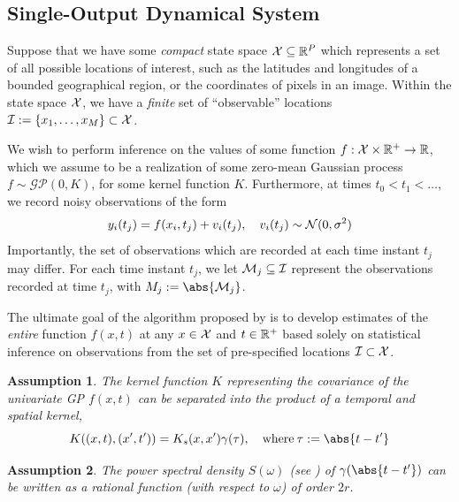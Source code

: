 \documentclass[10pt]{article}
\newtheorem{assumption}{Assumption}[section]
\numberwithin{equation}{section}
\newcommand{\calGP}{\mathcal{GP}}
\begin{document}
\subsection{Single-Output Dynamical System}
Suppose that we have some \emph{compact} state space $\mathcal{X} \subseteq \mathbb{R}^{P}$ which represents a set of all possible locations of interest, such as the latitudes and longitudes of a bounded geographical region, or the coordinates of pixels in an image. Within the state space $\mathcal{X}$, we have a \emph{finite} set of ``observable'' locations $\mathcal{I} := \{x_{1}, \dots, x_{M}\} \subset \mathcal{X}$.

We wish to perform inference on the values of some function $f: \mathcal{X} \times \mathbb{R}^{+} \to \mathbb{R}$, which we assume to be a realization of some zero-mean Gaussian process $f \sim \calGP(0, K)$, for some kernel function $K$. Furthermore, at times $t_{0} < t_{1} < \dots$, we record noisy observations of the form 
\begin{equation}
\label{eq:todescato-obs-model}
    y_{i}(t_{j}) = f(x_{i}, t_{j}) + v_{i}(t_{j}), \quad v_{i}(t_{j}) \sim \mathcal{N}(0, \sigma^{2}) 
\end{equation}
Importantly, the set of observations which are recorded at each time instant $t_{j}$ may differ. For each time instant $t_{j}$, we let $\mathcal{M}_{j} \subseteq \mathcal{I}$ represent the observations recorded at time $t_{j}$, with $M_{j} := \abs{\calM_{j}}$. 

The ultimate goal of the algorithm proposed by \citeauthor{Todescato-Efficient-2020} is to develop estimates of the \emph{entire} function $f(x, t)$ at any $x \in \mathcal{X}$ and $t \in \mathbb{R}^{+}$ based solely on statistical inference on observations from the set of pre-specified locations $\mathcal{I} \subset \mathcal{X}$.

\begin{assumption}
\label{ass:todescato-kernel-sep}
    The kernel function $K$ representing the covariance of the univariate GP $f(x, t)$ can be separated into the product of a temporal and spatial kernel,
    \begin{equation}
    \label{eq:GP-kernel-sep}
        K((x, t), (x', t')) = K_{s}(x, x')\gamma(\tau), \quad \textrm{where}\: \tau := \abs{t - t'}
    \end{equation}
\end{assumption}

\begin{assumption}
\label{ass:todescato-psd-order}
    The power spectral density $S(\omega)$ (see ) of $\gamma(\abs{t - t'})$ can be written as a rational function (with respect to $\omega$) of order $2r$. 
\end{assumption}
\end{document}
